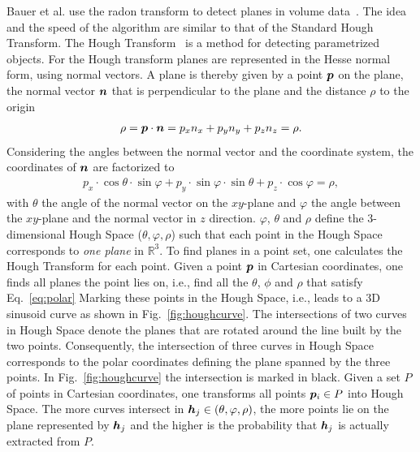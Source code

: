 \documentclass[twocolumn,oneside]{book}
\newcommand{\V}[1]{\vector{#1}}  %
\begin{document}
\begin{itemize}
  Bauer et al. use the radon transform to detect planes in volume
  data~\cite{Bauer:2008}. The idea and the speed of the algorithm are
  similar to that of the Standard Hough Transform. The Hough
  Transform~\cite{Hough:1962} is a method for detecting parametrized
  objects. For the Hough transform planes are represented in the Hesse
  normal form, using normal vectors. A plane is thereby given by a
  point $\V{p}$ on the plane, the normal vector $\V{n}$ that is
  perpendicular to the plane and the distance $\rho$ to the origin
  \begin{align*}
    \rho = \V p \cdot \V n  = {p}_x {n}_x + {p}_y {n}_y + {p}_z {n}_z = \rho .
  \end{align*}
  Considering the angles between the normal vector and the coordinate
  system, the coordinates of $\V n$ are factorized to
  \begin{align}
    {p}_x \cdot \cos{\theta} \cdot \sin{\varphi} + {p}_y \cdot \sin{\varphi} \cdot \sin{\theta} + {p}_z \cdot \cos{\varphi} = \rho ,
    \label{eq:polar}
  \end{align}
  with $\theta$ the angle of the normal vector on the $xy$-plane and
  $\varphi$ the angle between the $xy$-plane and the normal vector in
  $z$ direction. $\varphi$, $\theta$ and $\rho$ define the
  3-dimensional Hough Space ($\theta,\varphi,\rho$) such that each
  point in the Hough Space corresponds to \emph{one plane} in
  $\mathbb{R}^3$. To find planes in a point set, one calculates the
  Hough Transform for each point. Given a point $\V p$ in Cartesian
  coordinates, one finds all planes the point lies on, i.e., find all
  the $\theta$, $\phi$ and $\rho$ that satisfy Eq.~\eqref{eq:polar}
  Marking these points in the Hough Space, i.e., leads to a 3D
  sinusoid curve as shown in Fig.~\ref{fig:houghcurve}. The
  intersections of two curves in Hough Space denote the planes that
  are rotated around the line built by the two points. Consequently,
  the intersection of three curves in Hough Space corresponds to the
  polar coordinates defining the plane spanned by the three points. In
  Fig.~\ref{fig:houghcurve} the intersection is marked in black.
  Given a set $P$ of points in Cartesian coordinates, one transforms
  all points $\V{p}_i \in P$ into Hough Space. The more curves
  intersect in $\V{h}_j \in (\theta, \varphi, \rho)$, the more points
  lie on the plane represented by $\V{h}_j$ and the higher is the
  probability that $\V{h}_j$ is actually extracted from $P$.
  \begin{figure}

\end{figure}
\end{itemize}
\end{document}
